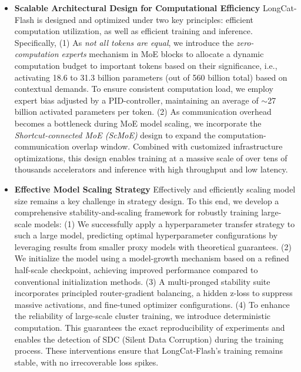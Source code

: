 \documentclass{article}
\newcommand{\longcat}{LongCat-Flash\xspace}
\newcommand{\chip}{accelerators\xspace}
\begin{document}
\begin{itemize}

\item \textbf{Scalable Architectural Design for Computational Efficiency} \longcat is designed and optimized under two key principles: efficient computation utilization, as well as efficient training and inference. Specifically, (1) As \textit{not all tokens are equal}, we introduce the \textit{zero-computation experts} mechanism in MoE blocks to allocate a dynamic computation budget to important tokens based on their significance, i.e., activating 18.6 to 31.3 billion parameters (out of 560 billion total) based on contextual demands. To ensure consistent computation load, we employ expert bias adjusted by a PID-controller, maintaining an average of $\sim$27 billion activated parameters per token. (2) As communication overhead becomes a bottleneck during MoE model scaling, we incorporate the \textit{Shortcut-connected MoE (ScMoE)} \citep{cai2024shortcut} design to expand the computation-communication overlap window. Combined with customized infrastructure optimizations, this design  enables training at a massive scale of over tens of thousands \chip and inference with high throughput and low latency.

\item \textbf{Effective Model Scaling Strategy} Effectively and efficiently scaling model size remains a key challenge in strategy design. To this end, we develop a comprehensive stability-and-scaling framework for robustly training large-scale models: (1) We successfully apply a hyperparameter transfer strategy to such a large model, predicting optimal hyperparameter configurations by leveraging results from smaller proxy models with theoretical guarantees. (2) We initialize the model using a model-growth mechanism based on a refined half-scale checkpoint, achieving improved performance compared to conventional initialization methods. (3) A multi-pronged stability suite incorporates principled router-gradient balancing, a hidden z-loss to suppress massive activations, and fine-tuned optimizer configurations. (4) To enhance the reliability of large-scale cluster training, we introduce deterministic computation. This guarantees the exact reproducibility of experiments and enables the detection of SDC (Silent Data Corruption) during the training process. These interventions ensure that \longcat’s training remains stable, with no irrecoverable loss spikes.


\end{itemize}
\end{document}
